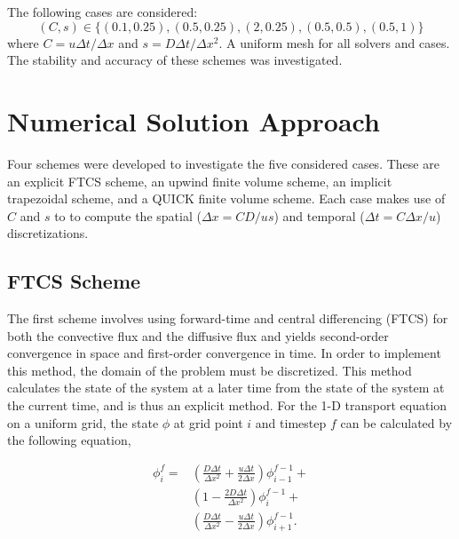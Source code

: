 \documentclass[twocolumn,10pt]{asme2ej}
\begin{document}
The following cases are considered:
\begin{equation*}
(C, s) \in \{(0.1, 0.25), (0.5, 0.25), (2, 0.25), (0.5, 0.5), (0.5, 1)\}
\end{equation*}
\noindent where $C = u\Delta t/\Delta x$ and $s = D\Delta t/\Delta x^2$. A uniform mesh for all solvers and cases. The stability and accuracy of these schemes was investigated.

\section{Numerical Solution Approach}

Four schemes were developed to investigate the five considered cases. These are an explicit FTCS scheme, an upwind finite volume scheme, an implicit trapezoidal scheme, and a QUICK finite volume scheme. Each case makes use of $C$ and $s$ to to compute the spatial ($\Delta x = C D / u s$) and temporal ($\Delta t = C \Delta x / u$) discretizations.

\subsection{FTCS Scheme}
The first scheme involves using forward-time and central differencing (FTCS) for both the convective flux and the diffusive flux and yields second-order convergence in space and first-order convergence in time. In order to implement this method, the domain of the problem must be discretized. This method calculates the state of the system at a later time from the state of the system at the current time, and is thus an explicit method. For the 1-D transport equation on a uniform grid, the state $\phi$ at grid point $i$ and timestep $f$ can be calculated by the following equation,

\begin{equation}
\label{ftcs_eqn}
\begin{split}
\phi_i ^f = & \left(\frac{D \Delta t}{\Delta x^2} + \frac{u \Delta t}{2 \Delta x}\right) \phi_{i-1} ^{f-1} + \\
            & \left(1-\frac{2 D\Delta t}{\Delta x^2}\right) \phi_i ^{f-1} + \\
            & \left(\frac{D \Delta t}{\Delta x^2} - \frac{u \Delta t}{2 \Delta x}\right) \phi_{i+1} ^{f-1}.
\end{split}
\end{equation}
\end{document}

